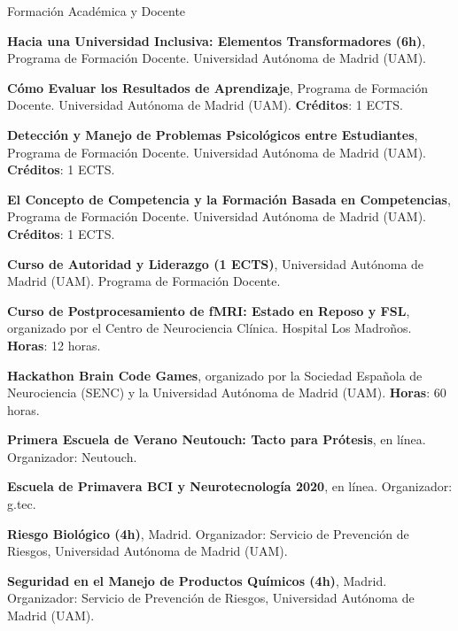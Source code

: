\begin{rubric}{Formación Académica y Docente}
	
	\entry*[9-11 de mayo de 2022] \textbf{Hacia una Universidad Inclusiva: Elementos Transformadores (6h)}, Programa de Formación Docente. Universidad Autónoma de Madrid (UAM).
	
	
	\entry*[15-17 de febrero de 2023] \textbf{Cómo Evaluar los Resultados de Aprendizaje}, Programa de Formación Docente. Universidad Autónoma de Madrid (UAM). \textbf{Créditos}: 1 ECTS.
	
	\entry*[20-27 de abril de 2023] \textbf{Detección y Manejo de Problemas Psicológicos entre Estudiantes}, Programa de Formación Docente. Universidad Autónoma de Madrid (UAM). \textbf{Créditos}: 1 ECTS.
	
	\entry*[17-24 de octubre de 2023] \textbf{El Concepto de Competencia y la Formación Basada en Competencias}, Programa de Formación Docente. Universidad Autónoma de Madrid (UAM). \textbf{Créditos}: 1 ECTS.
	
	\entry*[19-20 de febrero de 2024] \textbf{Curso de Autoridad y Liderazgo (1 ECTS)}, Universidad Autónoma de Madrid (UAM). Programa de Formación Docente.
	
	
	
	\entry*[Febrero 2024] \textbf{Curso de Postprocesamiento de fMRI: Estado en Reposo y FSL}, organizado por el Centro de Neurociencia Clínica. Hospital Los Madroños. \textbf{Horas}: 12 horas.
	
	\entry*[Octubre 2021] \textbf{Hackathon Brain Code Games}, organizado por la Sociedad Española de Neurociencia (SENC) y la Universidad Autónoma de Madrid (UAM). \textbf{Horas}: 60 horas.
	
	\entry*[Octubre 2020] \textbf{Primera Escuela de Verano Neutouch: Tacto para Prótesis}, en línea. Organizador: Neutouch.
	
	\entry*[Abril 2020] \textbf{Escuela de Primavera BCI y Neurotecnología 2020}, en línea. Organizador: g.tec.
	
	
	\entry*[18 de junio de 2019] \textbf{Riesgo Biológico (4h)}, Madrid. Organizador: Servicio de Prevención de Riesgos, Universidad Autónoma de Madrid (UAM).
	
	\entry*[4 de julio de 2019] \textbf{Seguridad en el Manejo de Productos Químicos (4h)}, Madrid. Organizador: Servicio de Prevención de Riesgos, Universidad Autónoma de Madrid (UAM).
	
	
	

\end{rubric}
